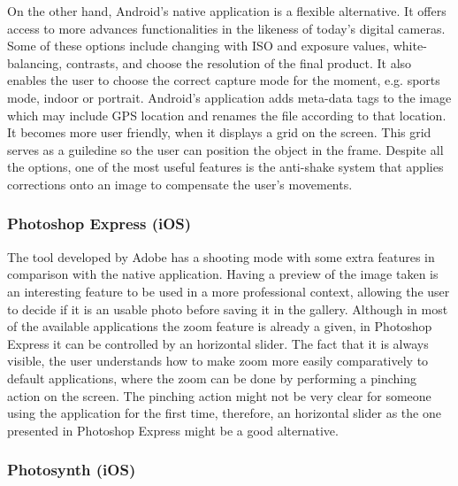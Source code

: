 On the other hand, Android's native application is a flexible alternative. It offers access to more advances functionalities in the likeness of today's digital cameras.
Some of these options include changing with ISO and exposure values, white-balancing, contrasts, and choose the resolution of the final product. It also enables the user to choose the correct capture mode for the moment, e.g. sports mode, indoor or portrait.
Android's application adds meta-data tags to the image which may include GPS location and renames the file according to that location. It becomes more user friendly, when it displays a grid on the screen. This grid serves as a guiledine so the user can position the object in the frame. Despite all the options, one of the most useful features is the anti-shake system that applies corrections onto an image to compensate the user's movements.

\subsubsection{Photoshop Express (iOS)}

The tool developed by Adobe \cite{Photoshop} has a shooting mode with some extra features in comparison with the native application.
Having a preview of the image taken is an interesting feature to be used in a more professional context, allowing the user to decide if it is an usable photo before saving it in the gallery.
Although in most of the available applications the zoom feature is already a given, in Photoshop Express it can be controlled by an horizontal slider. The fact that it is always visible, the user understands how to make zoom more easily comparatively to default applications, where the zoom can be done by performing a pinching action on the screen. The pinching action might not be very clear for someone using the application for the first time, therefore, an horizontal slider as the one presented in Photoshop Express might be a good alternative.

\subsubsection{Photosynth (iOS)}

